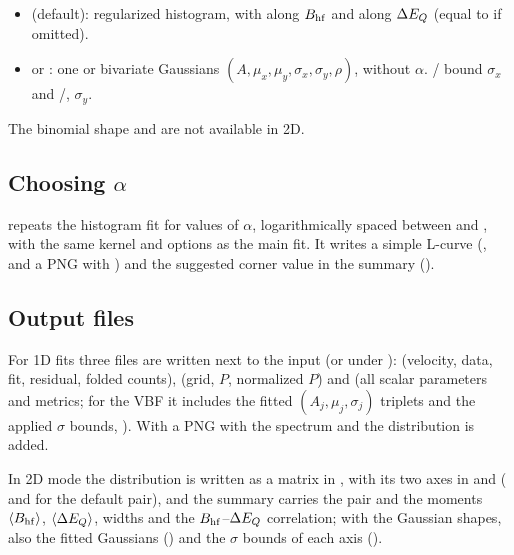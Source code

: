 \begin{itemize}[nosep]
  \item {} (default): regularized histogram, with
         along $B_{\mathrm{hf}}$ and  along $\Delta E_{Q}$
        (equal to  if omitted).
  \item {} or : one or 
        bivariate Gaussians $(A, \mu_x, \mu_y, \sigma_x, \sigma_y, \rho)$,
        without $\alpha$. / bound
        $\sigma_x$ and /,
        $\sigma_y$.
\end{itemize}

The binomial shape and  are not available in 2D.

\subsection{Choosing \texorpdfstring{$\alpha$}{alpha}}

 repeats the histogram fit for 
values of $\alpha$, logarithmically spaced between  and
, with the same kernel and options as the main fit. It
writes a simple L-curve (, and a PNG with
) and the suggested corner value in the summary
().

\subsection{Output files}

For 1D fits three files are written next to the input (or under
):  (velocity, data, fit,
residual, folded counts),  (grid, $P$, normalized
$P$) and  (all scalar parameters and metrics; for the
VBF it includes the fitted $(A_j,\mu_j,\sigma_j)$ triplets and the applied
$\sigma$ bounds, ). With
 a PNG with the spectrum and the distribution is added.

In 2D mode the distribution is written as a matrix in
, with its two axes in 
and  ( and 
for the default pair), and the summary carries the pair and
the moments $\langle B_{\mathrm{hf}}\rangle$, $\langle\Delta E_{Q}\rangle$, widths and the
$B_{\mathrm{hf}}$--$\Delta E_{Q}$ correlation; with the Gaussian shapes, also the fitted
Gaussians () and the $\sigma$ bounds of each axis
().
